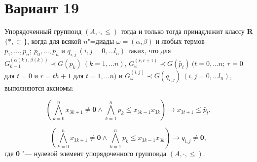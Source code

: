 \documentclass{article}
\begin{document}
\section*{Вариант 19}
Упорядоченный группоид $(A, \cdot, \leqslant)$ тогда и только тогда принадлежит классу \textbf{R}$\{ \ast, \subset\}$, когда для всякой $n$"=диады $\omega = (\alpha, \beta)$ и любых термов $p_1, \dots, p_n;~\tilde{p_0}, \dots, \tilde{p_n}$ и $q_{i,j}~(i, j = 0, \dots l_n)$ таких, что для $G_{k-1}^{(\alpha(k), \beta(k))} \prec G(p_k)~(k = 1, \dots n)$, $G_{\omega}^{(r,r+1)} \prec G(\tilde{p_t})~(t = 0, \dots n;~r = 0$ для $t = 0$ и $r = th + 1$ для $t = 1, \dots n)$ и $G_{\omega}^{(i,j)} \prec G(q_{i,j})~(i, j = 0, \dots l_n)$, выполняются аксиомы:

\begin{equation*}
    \left(\bigwedge\limits_{k=0}^{n} x_{3k+1} \neq \textbf{0} \wedge \bigwedge\limits_{k=1}^{n} p_k \leqslant x_{3k-1}x_{3k} \right) \rightarrow x_{3t+1} \leqslant \tilde{p_t},
\end{equation*}

\begin{equation*}
    \left( \bigwedge\limits_{k=0}^{n} x_{3k+1} \neq \textbf{0} \wedge \bigwedge\limits_{k=1}^{n} p_k \leqslant x_{3k-1}x_{3k} \right) \rightarrow q_{i,j} \neq \textbf{0},
\end{equation*}
где \textbf{0} "--- нулевой элемент упорядоченного группоида $(A, \cdot, \leqslant)$.
\end{document}
